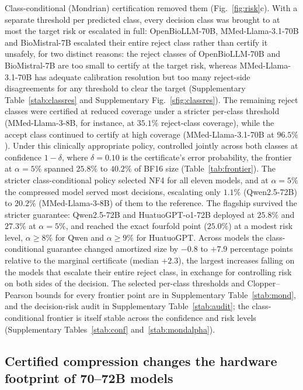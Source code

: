 \documentclass[pdflatex,sn-mathphys-num]{sn-jnl}%
\theoremstyle{thmstyleone}%
\theoremstyle{thmstyletwo}%
\theoremstyle{thmstylethree}%
\begin{document}
Class-conditional (Mondrian) certification removed them (Fig.~\ref{fig:risk}c). With a separate threshold per predicted
class, every decision class was brought to at most the target risk or escalated in full:
OpenBioLLM-70B, MMed-Llama-3.1-70B and BioMistral-7B escalated their entire reject class rather than certify it
unsafely, for two distinct reasons: the reject classes of OpenBioLLM-70B and BioMistral-7B are too small
to certify at the target risk, whereas MMed-Llama-3.1-70B has adequate calibration resolution but too
many reject-side disagreements for any threshold to clear the target (Supplementary
Table~\ref{stab:classres} and Supplementary Fig.~\ref{sfig:classres}). The remaining reject classes were certified at reduced coverage under a stricter
per-class threshold (MMed-Llama-3-8B, for instance, at $35.1\%$ reject-class coverage), while the
accept class continued to certify at high coverage (MMed-Llama-3.1-70B at $96.5\%$). Under this
clinically appropriate policy, controlled jointly across both classes at confidence $1-\delta$, where $\delta=0.10$ is the certificate's error probability, the
frontier at $\alpha=5\%$ spanned $25.8\%$ to $40.2\%$ of BF16 size (Table~\ref{tab:frontier}). The stricter class-conditional policy
selected NF4 for all eleven models, and at $\alpha=5\%$ the compressed model served most decisions,
escalating only $1.1\%$ (Qwen2.5-72B) to $20.2\%$ (MMed-Llama-3-8B) of them to the reference. The flagship survived the
stricter guarantee: Qwen2.5-72B and HuatuoGPT-o1-72B deployed at $25.8\%$ and $27.3\%$ at
$\alpha=5\%$, and reached the exact fourfold point ($25.0\%$) at a modest risk level, $\alpha\ge 8\%$
for Qwen and $\alpha\ge 9\%$ for HuatuoGPT. Across models the class-conditional guarantee changed amortized size by $-0.8$ to $+7.9$
percentage points relative to the marginal certificate (median $+2.3$), the largest increases
falling on the models that escalate their entire reject class, in exchange for controlling risk
on both sides of the decision. The selected per-class thresholds and Clopper--Pearson bounds for
every frontier point are in Supplementary Table~\ref{stab:mond}, and the decision-risk audit in
Supplementary Table~\ref{stab:audit}; the class-conditional frontier is itself stable across the
confidence and risk levels (Supplementary Tables~\ref{stab:conf} and~\ref{stab:mondalpha}).
 
\subsection*{Certified compression changes the hardware footprint of 70--72B models}
 
\end{document}
